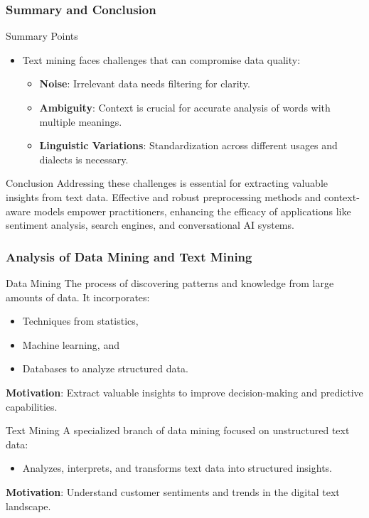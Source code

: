 \documentclass[aspectratio=169]{beamer}
\begin{document}
\begin{frame}[fragile]
    \frametitle{Summary and Conclusion}
    \begin{block}{Summary Points}
        \begin{itemize}
            \item Text mining faces challenges that can compromise data quality:
            \begin{itemize}
                \item \textbf{Noise}: Irrelevant data needs filtering for clarity.
                \item \textbf{Ambiguity}: Context is crucial for accurate analysis of words with multiple meanings.
                \item \textbf{Linguistic Variations}: Standardization across different usages and dialects is necessary.
            \end{itemize}
        \end{itemize}
    \end{block}
    \begin{block}{Conclusion}
        Addressing these challenges is essential for extracting valuable insights from text data. Effective and robust preprocessing methods and context-aware models empower practitioners, enhancing the efficacy of applications like sentiment analysis, search engines, and conversational AI systems.
    \end{block}
\end{frame}

\begin{frame}[fragile]
    \frametitle{Analysis of Data Mining and Text Mining}
    \begin{block}{Data Mining}
        The process of discovering patterns and knowledge from large amounts of data. It incorporates:
        \begin{itemize}
            \item Techniques from statistics,
            \item Machine learning, and
            \item Databases to analyze structured data.
        \end{itemize}
        \textbf{Motivation}: Extract valuable insights to improve decision-making and predictive capabilities.
    \end{block}
    
    \begin{block}{Text Mining}
        A specialized branch of data mining focused on unstructured text data:
        \begin{itemize}
            \item Analyzes, interprets, and transforms text data into structured insights.
        \end{itemize}
        \textbf{Motivation}: Understand customer sentiments and trends in the digital text landscape.
    \end{block}
\end{frame}
\end{document}

